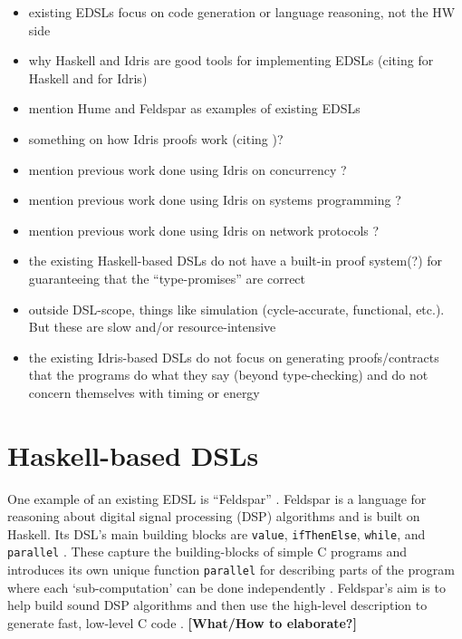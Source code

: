 \begin{itemize}
	\item existing EDSLs focus on code generation or language reasoning, not the
	      HW side
	\item why Haskell and Idris are good tools for implementing EDSLs (citing
    	  \cite{10.1007/3-540-45350-4_5,685738,hudak1996building} for Haskell
    	  and \cite{brady2015embedded} for Idris)
	\item mention Hume \cite{10.1007/978-3-540-39815-8_3} and Feldspar
  		  \cite{5558637} as examples of existing EDSLs
	\item something on how Idris proofs work (citing \cite{brady2015embedded})?
	\item mention previous work done using Idris on concurrency
		  \cite{brady2010correct}?
	\item mention previous work done using Idris on systems programming
		  \cite{10.1007/978-3-642-27694-1_18,Brady:2011:ISP:1929529.1929536}?
	\item mention previous work done using Idris on network protocols
		  \cite{5158855}?
	\item the existing Haskell-based DSLs do not have a built-in proof system(?)
		  for guaranteeing that the ``type-promises'' are correct
	\item outside DSL-scope, things like simulation (cycle-accurate, functional,
		  etc.). But these are slow and/or resource-intensive
	\item the existing Idris-based DSLs do not focus on generating
		  proofs/contracts that the programs do what they say (beyond
		  type-checking) and do not concern themselves with timing or energy
\end{itemize}

\section{Haskell-based DSLs}
	One example of an existing EDSL is ``Feldspar'' \cite{5558637}. Feldspar is a language for reasoning about digital signal processing (DSP) algorithms and is built on Haskell. Its DSL's main building blocks are \texttt{value}, \texttt{ifThenElse}, \texttt{while}, and \texttt{parallel} \cite{5558637}. These capture the building-blocks of simple C programs and introduces its own unique function \texttt{parallel} for describing parts of the program where each `sub-computation' can be done independently \cite{5558637}. Feldspar's aim is to help build sound DSP algorithms and then use the high-level description to generate fast, low-level C code \cite{5558637}. \textbf{[What/How to elaborate?]}
    \\\par
	
